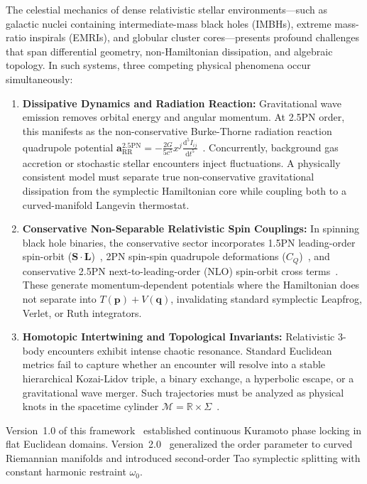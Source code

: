 \documentclass[11pt,a4paper,reqno]{article}
\theoremstyle{plain}
\theoremstyle{definition}
\theoremstyle{remark}
\numberwithin{equation}{section}
\begin{document}
The celestial mechanics of dense relativistic stellar environments---such as galactic nuclei containing intermediate-mass black holes (IMBHs), extreme mass-ratio inspirals (EMRIs), and globular cluster cores---presents profound challenges that span differential geometry, non-Hamiltonian dissipation, and algebraic topology. In such systems, three competing physical phenomena occur simultaneously:
\begin{enumerate}
    \item \textbf{Dissipative Dynamics and Radiation Reaction:} Gravitational wave emission removes orbital energy and angular momentum. At 2.5PN order, this manifests as the non-conservative Burke-Thorne radiation reaction quadrupole potential $\bm{a}_{\mathrm{RR}}^{2.5\mathrm{PN}} = -\frac{2 G}{5 c^5} x^j \frac{\mathrm{d}^5 I_{ij}}{\mathrm{d}t^5}$~\cite{BurkeThorne1970}. Concurrently, background gas accretion or stochastic stellar encounters inject fluctuations. A physically consistent model must separate true non-conservative gravitational dissipation from the symplectic Hamiltonian core while coupling both to a curved-manifold Langevin thermostat.
    \item \textbf{Conservative Non-Separable Relativistic Spin Couplings:} In spinning black hole binaries, the conservative sector incorporates 1.5PN leading-order spin-orbit ($\bm{S} \cdot \bm{L}$)~\cite{BarkerOConnell1979}, 2PN spin-spin quadrupole deformations ($C_Q$)~\cite{Kidder1995}, and conservative 2.5PN next-to-leading-order (NLO) spin-orbit cross terms~\cite{FayeBlanchetBuonanno2006,DamourJaranowskiSchafer2008}. These generate momentum-dependent potentials where the Hamiltonian does not separate into $T(\bm{p}) + V(\bm{q})$, invalidating standard symplectic Leapfrog, Verlet, or Ruth integrators.
    \item \textbf{Homotopic Intertwining and Topological Invariants:} Relativistic 3-body encounters exhibit intense chaotic resonance. Standard Euclidean metrics fail to capture whether an encounter will resolve into a stable hierarchical Kozai-Lidov triple, a binary exchange, a hyperbolic escape, or a gravitational wave merger. Such trajectories must be analyzed as physical knots in the spacetime cylinder $\mathcal{M} = \mathbb{R} \times \Sigma$~\cite{Artin1947,Birman1974}.
\end{enumerate}

Version~1.0 of this framework~\cite{Ananda2026V1} established continuous Kuramoto phase locking in flat Euclidean domains. Version~2.0~\cite{Ananda2026V2} generalized the order parameter to curved Riemannian manifolds and introduced second-order Tao symplectic splitting with constant harmonic restraint $\omega_0$. 
\end{document}

